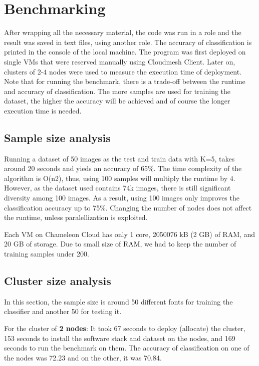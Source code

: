 \documentclass[9pt,twocolumn,twoside]{../../styles/osajnl}
\begin{document}
\section{Benchmarking}

After wrapping all the necessary material, the code was run in a role and the result
was saved in text files, using another role. The accuracy of classification is printed
in the console of the local machine.
The program was first deployed on single VMs that were reserved manually using 
Cloudmesh Client. Later on, clusters of 2-4 nodes were used to measure the execution
time of deployment. Note that for running the benchmark, there is a trade-off between the runtime
and accuracy of classification. The more samples are used for training the dataset, the higher the
accuracy will be achieved and of course the longer execution time is needed. 

\subsection{Sample size analysis}

Running a dataset of 50 images as the test and train data
with K=5, takes around 20 seconds and yieds an accuracy of 65\%. The time complexity
of the algorithm is O(n2), thus, using 100 samples will multiply the runtime by 4. 
However, as the dataset used contains 74k images, there is still significant diversity
among 100 images. As a result, using 100 images only improves the classification 
accuracy up to 75\%. Changing the number of nodes does not affect the runtime, unless paralellization
is exploited.

Each VM on Chameleon Cloud has only 1 core, 2050076 kB (2 GB) of RAM, and 20 GB of storage.
Due to small size of RAM, we had to keep the number of training samples under 200.

\subsection{Cluster size analysis}

In this section, the sample size is around 50 different fonts for training the classifier and another 50 for testing it.

For the cluster of \textbf{2 nodes}:
It took 67 seconds to deploy (allocate) the cluster, 153 seconds to install the software stack
and dataset on the nodes, and 169 seconds to run the benchmark on them. The accuracy of classification on one of the nodes was 72.23 and on the other, it was 70.84.
\end{document}
